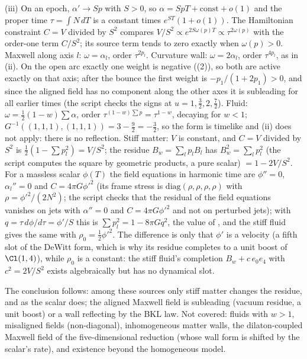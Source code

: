 (iii) On an epoch, $\alpha' \to Sp$ with $S > 0$, so $\alpha = SpT + \mathrm{const} + o(1)$ and the proper time $\tau = \int N\,dT$ is a constant times $e^{ST}(1 + o(1))$. The Hamiltonian constraint $C = V$ divided by $S^{2}$ compares $V/S^{2} \propto e^{2S\omega(p)T} \propto \tau^{2\omega(p)}$ with the order-one term $C/S^{2}$; its source term tends to zero exactly when $\omega(p) > 0$. Maxwell along axis $l$: $\omega = \alpha_{l}$, order $\tau^{2p_{l}}$. Curvature wall: $\omega = 2\alpha_{l}$, order $\tau^{4p_{l}}$, as in (ii). On the open arc exactly one weight is negative ((2)), so both are active exactly on that axis; after the bounce the first weight is $-p_{1}/(1 + 2p_{1}) > 0$, and since the aligned field has no component along the other axes it is subleading for all earlier times (the script checks the signs at $u = 1, \tfrac32, 2, \tfrac72$). Fluid: $\omega = \tfrac12(1 - w)\sum\alpha$, order $\tau^{(1 - w)\sum p} = \tau^{1 - w}$, decaying for $w < 1$; $G^{-1}((1, 1, 1), (1, 1, 1)) = 3 - \tfrac92 = -\tfrac32$, so the form is timelike and (ii) does not apply: there is no reflection. Stiff matter: $V$ is constant, and $C = V$ divided by $S^{2}$ is $\tfrac12(1 - \sum p_{l}^{2}) = V/S^{2}$; the residue $B_{w} = \sum_{l}p_{l}B_{l}$ has $B_{w}^{2} = \sum_{l}p_{l}^{2}$ (the script computes the square by geometric products, a pure scalar) $= 1 - 2V/S^{2}$. For a massless scalar $\phi(T)$ the field equations in harmonic time are $\phi'' = 0$, $\alpha_{l}'' = 0$ and $C = 4\pi G\phi'^{2}$ (its frame stress is $\mathrm{diag}(\rho, \rho, \rho, \rho)$ with $\rho = \phi'^{2}/(2N^{2})$; the script checks that the residual of the field equations vanishes on jets with $\alpha'' = 0$ and $C = 4\pi G\phi'^{2}$ and not on perturbed jets); with $q = \tau\,d\phi/d\tau = \phi'/S$ this is $\sum p_{l}^{2} = 1 - 8\pi Gq^{2}$, the value of , and the stiff fluid gives the same with $\rho_{0} = \tfrac12\phi'^{2}$. The difference is only that $\phi'$ is a velocity (a fifth slot of the DeWitt form, which is why its residue completes to a unit boost of $\Cl(1,4)$), while $\rho_{0}$ is a constant: the stiff fluid's completion $B_{w} + c\,e_{0}e_{4}$ with $c^{2} = 2V/S^{2}$ exists algebraically but has no dynamical slot.

The conclusion follows: among these sources only stiff matter changes the residue, and as the scalar does; the aligned Maxwell field is subleading (vacuum residue, a unit boost) or a wall reflecting by the BKL law. Not covered: fluids with $w > 1$, misaligned fields (non-diagonal), inhomogeneous matter walls, the dilaton-coupled Maxwell field of the five-dimensional reduction (whose wall form is shifted by the scalar's rate), and existence beyond the homogeneous model.
